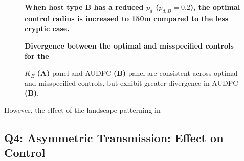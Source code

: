 \documentclass[11pt,letterpaper]{article}
\begin{document}
{\begin{figure}[h]

\caption { \label{pdclust4000exp} \textbf{
When host type B has a reduced $p_d$ ($p_{d, B} = 0.2$), the optimal control radius is increased to 150m compared to the less cryptic case.}}
\end{figure}



\begin{figure}[h]

\caption { \label{clustdeltapdcompare} 
\textbf{Divergence between the optimal and misspecified controls for the }
} 

\end{figure}


\begin{figure}[h]

\caption { \label{sigmaclust4000exp} 
}
\end{figure}

\begin{figure}[h]

\caption { \label{sigmaclustcompare} $K_E$ \textbf{(A)} panel and AUDPC \textbf{(B)} panel are consistent across optimal and misspecified controls, but exhibit greater divergence in AUDPC \textbf{(B)}.} 
\end{figure}


%



%


However, the effect of the landscape patterning in

\FloatBarrier
\subsection*{Q4: Asymmetric Transmission: Effect on Control}

}
\end{document}

